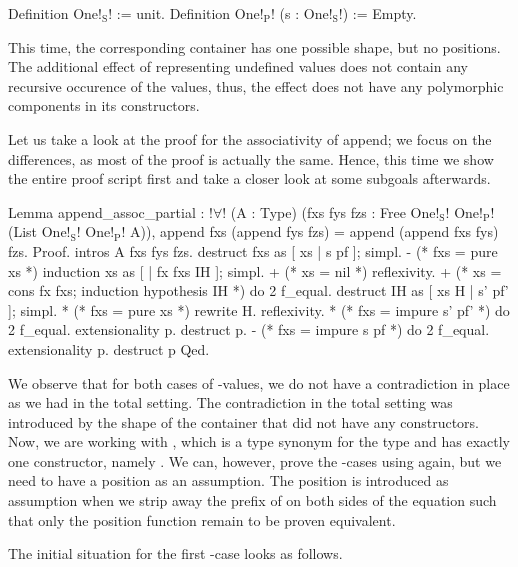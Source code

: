 \begin{coqcode}
Definition One!$_\text{S}$! := unit.
Definition One!$_\text{P}$! (s : One!$_\text{S}$!) := Empty.
\end{coqcode}

This time, the corresponding container has one possible shape, but no positions.
The additional effect of representing undefined values does not contain any recursive occurence of the  values, thus, the effect does not have any polymorphic components in its constructors.

Let us take a look at the proof for the associativity of append; we focus on the differences, as most of the proof is actually the same.
Hence, this time we show the entire proof script first and take a closer look at some subgoals afterwards.

\begin{coqcode}
Lemma append_assoc_partial :
 !$\forall$! (A : Type) (fxs fys fzs : Free One!$_\text{S}$! One!$_\text{P}$! (List One!$_\text{S}$! One!$_\text{P}$! A)),
   append fxs (append fys fzs) = append (append fxs fys) fzs.
Proof.
 intros A fxs fys fzs.
 destruct fxs as [ xs | s pf ]; simpl.
 - (* fxs = pure xs *) induction xs as [ | fx fxs IH ]; simpl.
   + (* xs = nil *) reflexivity.
   + (* xs = cons fx fxs; induction hypothesis IH *)
     do 2 f_equal. destruct IH as [ xs H | s' pf' ]; simpl.
     * (* fxs = pure xs *) rewrite H. reflexivity.
     * (* fxs = impure s' pf' *)
       do 2 f_equal. extensionality p. destruct p.
  - (* fxs = impure s pf *)
    do 2 f_equal. extensionality p. destruct p
Qed.
\end{coqcode}

We observe that for both cases of \--values, we do not have a contradiction in place as we had in the total setting.
The contradiction in the total setting was introduced by the shape of the container that did not have any constructors.
Now, we are working with , which is a type synonym for the  type and has exactly one constructor, namely .
We can, however, prove the \--cases using  again, but we need to have a position as an assumption.
The position is introduced as assumption when we strip away the prefix of  on both sides of the equation such that only the position function  remain to be proven equivalent.

The initial situation for the first \--case looks as follows.

